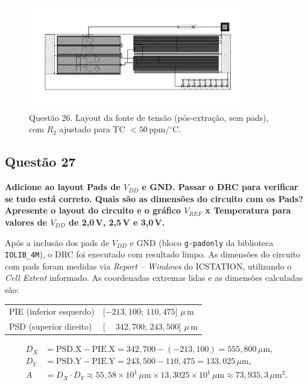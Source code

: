 \documentclass[12pt,a4paper]{article}
\newcommand{\degree}{\ensuremath{{}^\circ}}
\begin{document}
\begin{figure}[H]
    \centering
    \includegraphics[width=0.85\textwidth]{images/layout26.png}
    \caption{Questão 26. Layout da fonte de tensão (pós-extração, sem pads), com $R_2$ ajustado para TC $<50$\,ppm/\degree C.}
    \label{fig:q26_layout}
\end{figure}

\subsection*{Questão 27}
	\textbf{Adicione ao layout Pads de $V_{DD}$ e GND. Passar o DRC para verificar se tudo está correto. Quais são as dimensões do circuito com os Pads? Apresente o layout do circuito e o gráfico $V_{REF}$ x Temperatura para valores de $V_{DD}$ de 2{,}0\,V, 2{,}5\,V e 3{,}0\,V.}

Após a inclusão dos pads de $V_{DD}$ e GND (bloco \texttt{g-padonly} da biblioteca \texttt{IOLIB\_4M}), o DRC foi executado com resultado limpo. As dimensões do circuito com pads foram medidas via \emph{Report -- Windows} do ICSTATION, utilizando o \emph{Cell Extent} informado. As coordenadas extremas lidas e as dimensões calculadas são:

\begin{center}
\begin{tabular}{@{}ll@{}}
PIE (inferior esquerdo) & [$-213{,}100$; $110{,}475$]\,\,$\mu$\,m \\
PSD (superior direito)  & [$\phantom{-}342{,}700$; $243{,}500$]\,\,$\mu$\,m \\
\end{tabular}
\end{center}

\[
\begin{aligned}
D_X &= \text{PSD.X} - \text{PIE.X} = 342{,}700 - (-213{,}100) = 555{,}800\,\mu\text{m},\\
D_Y &= \text{PSD.Y} - \text{PIE.Y} = 243{,}500 - 110{,}475 = 133{,}025\,\mu\text{m},\\
A   &= D_X\cdot D_Y \approx 55{,}58\times 10^{1}\,\mu\text{m} \times 13{,}3025\times 10^{1}\,\mu\text{m} \approx 73{,}935{,}3\,\mu\text{m}^2.
\end{aligned}
\]
\end{document}
